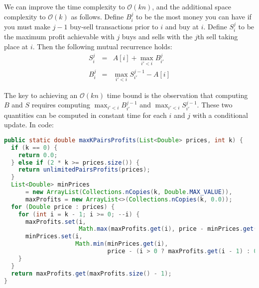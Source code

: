 \documentclass[10pt,openany,twoside,letterpaper,extrafontsizes]{memoir}
\newif\ifCpp
\newif\ifJava
\begin{document}
\begin{Spacing}{\honorsSpacing}
We can improve the time complexity to $\mathcal{O}(kn)$, and the
additional space complexity to $\mathcal{O}(k)$ as follows.
Define $B^j_i$ to be the most money you can have if you must make $j-1$ buy-sell transactions
prior to $i$ and buy at $i$.
Define $S^j_i$ to be the maximum profit achievable with $j$ buys and sells with the $j$th
sell taking place at $i$. Then the following mutual recurrence holds:
\begin{eqnarray*}
S^j_i & = & A[i] + \max_{i'<i}{B^{j}_{i'}} \\
B^j_i & = & \max_{i'<i}{S^{j-1}_{i'}} - A[i]
\end{eqnarray*}

The key to achieving an $\mathcal{O}(kn)$ time
bound is the observation that computing $B$ and $S$
requires computing $\max_{i'<i}B^{j-1}_{i'}$ and $\max_{i'<i}S^{j-1}_{i'}$. These two
quantities can be computed in constant time for each $i$ and $j$ with a conditional update.
In code:
\ifCpp
\begin{lstlisting}[language={[11]C++}]
double MaxKPairsProfits(const vector<double> &prices, int k) {
  if (!k) {
    return 0.0;
  } else if (2 * k >= prices.size()) {
    return UnlimitedPairsProfits(prices);
  }
  vector<double> min_prices(k, numeric_limits<double>::max()),
      max_profits(k, 0.0);
  for (const double &price : prices) {
    for (int i = k - 1; i >= 0; --i) {
      max_profits[i] = max(max_profits[i], price - min_prices[i]);
      min_prices[i] =
          min(min_prices[i], price - (i ? max_profits[i - 1] : 0.0));
    }
  }
  return max_profits.back();
}

double UnlimitedPairsProfits(const vector<double> &prices) {
  double profit = 0.0;
  for (int i = 1; i < prices.size(); ++i) {
    profit += max(0.0, prices[i] - prices[i - 1]);
  }
  return profit;
}
\end{lstlisting}
\fi%
\ifJava
\begin{lstlisting}[language=Java]
public static double maxKPairsProfits(List<Double> prices, int k) {
  if (k == 0) {
    return 0.0;
  } else if (2 * k >= prices.size()) {
    return unlimitedPairsProfits(prices);
  }
  List<Double> minPrices
      = new ArrayList(Collections.nCopies(k, Double.MAX_VALUE)),
      maxProfits = new ArrayList<>(Collections.nCopies(k, 0.0));
  for (Double price : prices) {
    for (int i = k - 1; i >= 0; --i) {
      maxProfits.set(i,
                     Math.max(maxProfits.get(i), price - minPrices.get(i)));
      minPrices.set(i,
                    Math.min(minPrices.get(i),
                             price - (i > 0 ? maxProfits.get(i - 1) : 0.0)));
    }
  }
  return maxProfits.get(maxProfits.size() - 1);
}


\end{lstlisting}
\end{Spacing}
\end{document}
